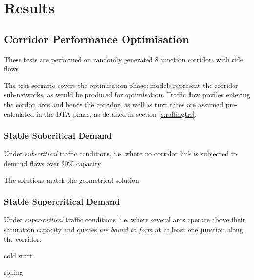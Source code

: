 
\chapter{Results} \label{c:results}


\section{Corridor Performance Optimisation}
These tests are performed on randomly generated 8 junction corridors with side flows

The test scenario covers the optimisation phase: models represent the corridor sub-networks, as would be produced for optimisation. Traffic flow profiles entering the cordon arcs and hence the corridor, as well as turn rates are assumed pre-calculated in the DTA phase, as detailed in section \ref{s:rollingtre}.


\subsection{Stable Subcritical Demand}

Under \emph{sub-critical} traffic conditions, i.e. where no corridor link is subjected to demand flows over 80\% capacity 


The solutions match the geometrical solution


\subsection{Stable Supercritical Demand}
Under \emph{super-critical} traffic conditions, i.e. where several arcs operate above their saturation capacity and queues \emph{are bound to form} at at least one junction along the corridor.

cold start

rolling



